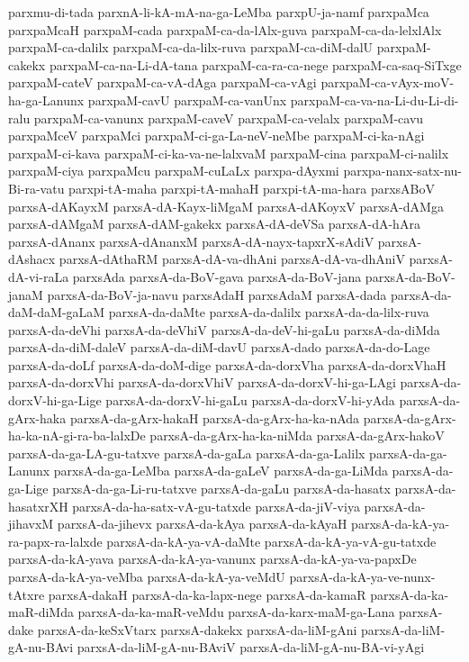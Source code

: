 {parxmu-di-tada
parxnA-li-kA-mA-na-ga-LeMba
parxpU-ja-namf
parxpaMca
parxpaMcaH
parxpaM-cada
parxpaM-ca-da-lAlx-guva
parxpaM-ca-da-lelxlAlx
parxpaM-ca-dalilx
parxpaM-ca-da-lilx-ruva
parxpaM-ca-diM-dalU
parxpaM-cakekx
parxpaM-ca-na-Li-dA-tana
parxpaM-ca-ra-ca-nege
parxpaM-ca-saq-SiTxge
parxpaM-cateV
parxpaM-ca-vA-dAga
parxpaM-ca-vAgi
parxpaM-ca-vAyx-moV-ha-ga-Lanunx
parxpaM-cavU
parxpaM-ca-vanUnx
parxpaM-ca-va-na-Li-du-Li-di-ralu
parxpaM-ca-vanunx
parxpaM-caveV
parxpaM-ca-velalx
parxpaM-cavu
parxpaMceV
parxpaMci
parxpaM-ci-ga-La-neV-neMbe
parxpaM-ci-ka-nAgi
parxpaM-ci-kava
parxpaM-ci-ka-va-ne-lalxvaM
parxpaM-cina
parxpaM-ci-nalilx
parxpaM-ciya
parxpaMcu
parxpaM-cuLaLx
parxpa-dAyxmi
parxpa-nanx-satx-nu-Bi-ra-vatu
parxpi-tA-maha
parxpi-tA-mahaH
parxpi-tA-ma-hara
parxsABoV
parxsA-dAKayxM
parxsA-dA-Kayx-liMgaM
parxsA-dAKoyxV
parxsA-dAMga
parxsA-dAMgaM
parxsA-dAM-gakekx
parxsA-dA-deVSa
parxsA-dA-hAra
parxsA-dAnanx
parxsA-dAnanxM
parxsA-dA-nayx-tapxrX-sAdiV
parxsA-dAshacx
parxsA-dAthaRM
parxsA-dA-va-dhAni
parxsA-dA-va-dhAniV
parxsA-dA-vi-raLa
parxsAda
parxsA-da-BoV-gava
parxsA-da-BoV-jana
parxsA-da-BoV-janaM
parxsA-da-BoV-ja-navu
parxsAdaH
parxsAdaM
parxsA-dada
parxsA-da-daM-daM-gaLaM
parxsA-da-daMte
parxsA-da-dalilx
parxsA-da-da-lilx-ruva
parxsA-da-deVhi
parxsA-da-deVhiV
parxsA-da-deV-hi-gaLu
parxsA-da-diMda
parxsA-da-diM-daleV
parxsA-da-diM-davU
parxsA-dado
parxsA-da-do-Lage
parxsA-da-doLf
parxsA-da-doM-dige
parxsA-da-dorxVha
parxsA-da-dorxVhaH
parxsA-da-dorxVhi
parxsA-da-dorxVhiV
parxsA-da-dorxV-hi-ga-LAgi
parxsA-da-dorxV-hi-ga-Lige
parxsA-da-dorxV-hi-gaLu
parxsA-da-dorxV-hi-yAda
parxsA-da-gArx-haka
parxsA-da-gArx-hakaH
parxsA-da-gArx-ha-ka-nAda
parxsA-da-gArx-ha-ka-nA-gi-ra-ba-lalxDe
parxsA-da-gArx-ha-ka-niMda
parxsA-da-gArx-hakoV
parxsA-da-ga-LA-gu-tatxve
parxsA-da-gaLa
parxsA-da-ga-Lalilx
parxsA-da-ga-Lanunx
parxsA-da-ga-LeMba
parxsA-da-gaLeV
parxsA-da-ga-LiMda
parxsA-da-ga-Lige
parxsA-da-ga-Li-ru-tatxve
parxsA-da-gaLu
parxsA-da-hasatx
parxsA-da-hasatxrXH
parxsA-da-ha-satx-vA-gu-tatxde
parxsA-da-jiV-viya
parxsA-da-jihavxM
parxsA-da-jihevx
parxsA-da-kAya
parxsA-da-kAyaH
parxsA-da-kA-ya-ra-papx-ra-lalxde
parxsA-da-kA-ya-vA-daMte
parxsA-da-kA-ya-vA-gu-tatxde
parxsA-da-kA-yava
parxsA-da-kA-ya-vanunx
parxsA-da-kA-ya-va-papxDe
parxsA-da-kA-ya-veMba
parxsA-da-kA-ya-veMdU
parxsA-da-kA-ya-ve-nunx-tAtxre
parxsA-dakaH
parxsA-da-ka-lapx-nege
parxsA-da-kamaR
parxsA-da-ka-maR-diMda
parxsA-da-ka-maR-veMdu
parxsA-da-karx-maM-ga-Lana
parxsA-dake
parxsA-da-keSxVtarx
parxsA-dakekx
parxsA-da-liM-gAni
parxsA-da-liM-gA-nu-BAvi
parxsA-da-liM-gA-nu-BAviV
parxsA-da-liM-gA-nu-BA-vi-yAgi
}
